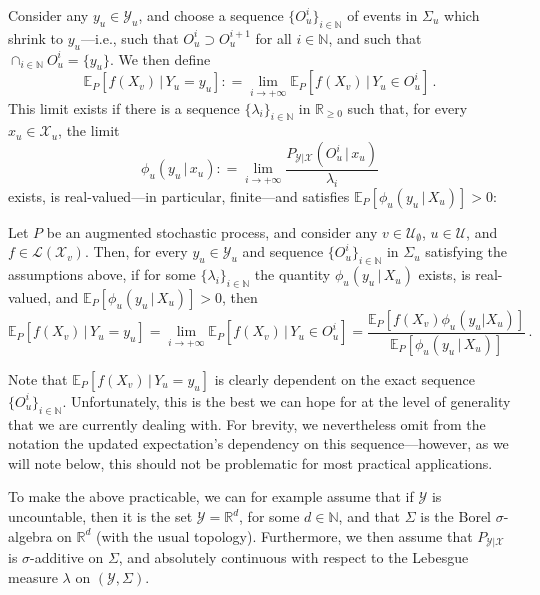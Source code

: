 \documentclass[twoside,11pt]{article}
\newcommand{\nats}{\mathbb{N}}
\newcommand{\reals}{\mathbb{R}}
\newcommand{\realsnonneg}{\reals_{\geq 0}}
\newcommand{\states}{\mathcal{X}}
\newcommand{\observs}{\mathcal{Y}}
\newcommand{\gambles}{\mathcal{L}}
\newcommand{\coloneqq}{:\!=}
\begin{document}
Consider any $y_u\in\observs_u$, and choose a sequence $\{O_u^i\}_{i\in\nats}$ of events in $\Sigma_u$ which shrink to $y_u$---i.e., such that $O_u^i\supset O_u^{i+1}$ for all $i\in\nats$, and such that $\cap_{i\in\nats} O_u^i=\{y_u\}$. We then define
\begin{equation*}
\mathbb{E}_P[f(X_v)\,\vert\,Y_u=y_u] \coloneqq \lim_{i\to+\infty} \mathbb{E}_P[f(X_v)\,\vert\,Y_u\in O_u^i]\,.
\end{equation*}
This limit exists if there is a sequence $\{\lambda_i\}_{i\in\nats}$ in $\realsnonneg$ such that, for every $x_u\in\states_u$, the limit
\begin{equation*}
\phi_u(y_u\,\vert\, x_u) \coloneqq \lim_{i\to+\infty}\frac{P_{\observs\vert\states}(O_u^i\,\vert\, x_u)}{\lambda_i}
\end{equation*}
exists, is real-valued---in particular, finite---and satisfies $\mathbb{E}_P[\phi_u(y_u\,\vert\,X_u)]>0$:
\begin{proposition}\label{prop:precise_bayes_rule_densities}
Let $P$ be an augmented stochastic process, and consider any $v\in\mathcal{U}_\emptyset$, $u\in\mathcal{U}$, and $f\in\gambles(\states_v)$. Then, for every $y_u\in\observs_u$ and sequence $\{O_u^i\}_{i\in\nats}$ in $\Sigma_u$ satisfying the assumptions above, if for some $\{\lambda_i\}_{i\in\nats}$ the quantity $\phi_u(y_u\,\vert\,X_u)$ exists, is real-valued, and $\mathbb{E}_P[\phi_u(y_u\,\vert\,X_u)]>0$, then
\begin{equation}\label{eq:updated_expectation_is_limit}
\mathbb{E}_P[f(X_v)\,\vert\,Y_u=y_u] = \lim_{i\to+\infty} \mathbb{E}_P[f(X_v)\,\vert\,Y_u\in O_u^i] = \frac{\mathbb{E}_P[f(X_v)\phi_u(y_u\vert X_u)]}{\mathbb{E}_P[\phi_u(y_u\,\vert\,X_u)]}\,.
\end{equation}
\end{proposition}
Note that $\mathbb{E}_P[f(X_v)\,\vert\,Y_u=y_u]$ is clearly dependent on the exact sequence $\{O_u^i\}_{i\in\nats}$. Unfortunately, this is the best we can hope for at the level of generality that we are currently dealing with. %
For brevity, we nevertheless omit from the notation the updated expectation's dependency on this sequence---however, as we will note below, this should not be problematic for most practical applications.

To make the above practicable, we can for example assume that if $\observs$ is uncountable, then it is the set $\observs=\reals^d$, for some $d\in\nats$, and that $\Sigma$ is the Borel $\sigma$-algebra on $\reals^d$ (with the usual topology). Furthermore, we then assume that $P_{\observs\vert\states}$ is $\sigma$-additive on $\Sigma$, and absolutely continuous with respect to the Lebesgue measure $\lambda$ on $(\observs,\Sigma)$. 
\end{document}
